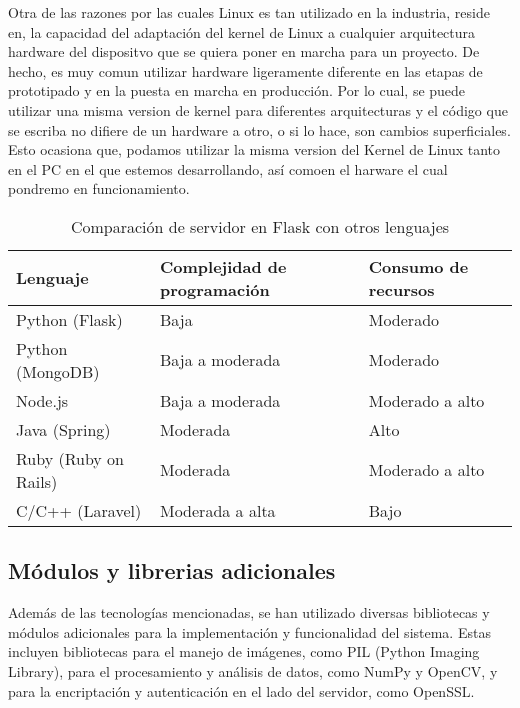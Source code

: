 Otra de las razones por las cuales Linux es tan utilizado en la industria, reside en, la capacidad del adaptación del kernel de Linux a cualquier arquitectura hardware del dispositvo que se quiera poner en marcha para un proyecto. De hecho, es muy comun utilizar hardware ligeramente diferente en las etapas de prototipado y en la puesta en marcha en producción. Por lo cual, se puede utilizar una misma version de kernel para diferentes arquitecturas y el código que se escriba no difiere de un hardware a otro, o si lo hace, son cambios superficiales. Esto ocasiona que, podamos utilizar la misma version del Kernel de Linux tanto en el PC en el que estemos desarrollando, así comoen el harware el cual pondremo en funcionamiento.


\begin{table}[h]
\centering
\caption{Comparación de servidor en Flask con otros lenguajes}
\label{tabla:comparacion-servidor}
\begin{tabular}{|l|l|l|}
\hline
\textbf{Lenguaje}    & \textbf{Complejidad de programación} & \textbf{Consumo de recursos}  \\ \hline
Python (Flask)       & Baja                                 & Moderado                      \\ \hline
Python (MongoDB)     & Baja a moderada                      & Moderado                      \\ \hline
Node.js              & Baja a moderada                      & Moderado a alto               \\ \hline
Java (Spring)        & Moderada                             & Alto                          \\ \hline
Ruby (Ruby on Rails) & Moderada                             & Moderado a alto               \\ \hline
C/C++ (Laravel)      & Moderada a alta                      & Bajo                          \\ \hline
\end{tabular}
\end{table}


\subsection{Módulos y librerias adicionales}
Además de las tecnologías mencionadas, se han utilizado diversas bibliotecas y módulos adicionales para la implementación y funcionalidad del sistema. Estas incluyen bibliotecas para el manejo de imágenes, como PIL (Python Imaging Library), para el procesamiento y análisis de datos, como NumPy y OpenCV, y para la encriptación y autenticación en el lado del servidor, como OpenSSL.


